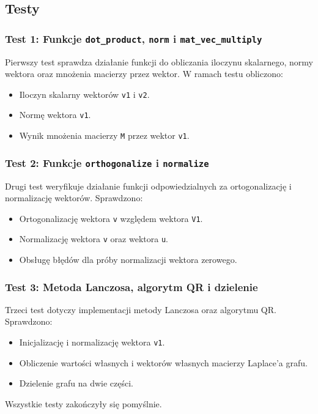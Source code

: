 \documentclass{article}
\begin{document}
    \subsection{Testy}

    \subsubsection{Test 1: Funkcje \texttt{dot\_product}, \texttt{norm} i \texttt{mat\_vec\_multiply}}
    Pierwszy test sprawdza działanie funkcji do obliczania iloczynu skalarnego, normy wektora oraz mnożenia macierzy przez wektor. W ramach testu obliczono:
    \begin{itemize}
        \item Iloczyn skalarny wektorów \texttt{v1} i \texttt{v2}.
        \item Normę wektora \texttt{v1}.
        \item Wynik mnożenia macierzy \texttt{M} przez wektor \texttt{v1}.
    \end{itemize}
    
    \subsubsection{Test 2: Funkcje \texttt{orthogonalize} i \texttt{normalize}}
    
    Drugi test weryfikuje działanie funkcji odpowiedzialnych za ortogonalizację i normalizację wektorów. Sprawdzono:
    \begin{itemize}
        \item Ortogonalizację wektora \texttt{v} względem wektora \texttt{V1}.
        \item Normalizację wektora \texttt{v} oraz wektora \texttt{u}.
        \item Obsługę błędów dla próby normalizacji wektora zerowego.
    \end{itemize}
    
    \subsubsection{Test 3: Metoda Lanczosa, algorytm QR i dzielenie}
    
    Trzeci test dotyczy implementacji metody Lanczosa oraz algorytmu QR. Sprawdzono:
    \begin{itemize}
        \item Inicjalizację i normalizację wektora \texttt{v1}.
        \item Obliczenie wartości własnych i wektorów własnych macierzy Laplace'a grafu.
        \item Dzielenie grafu na dwie części.
    \end{itemize}
    Wszystkie testy zakończyły się pomyślnie.
\end{document}
